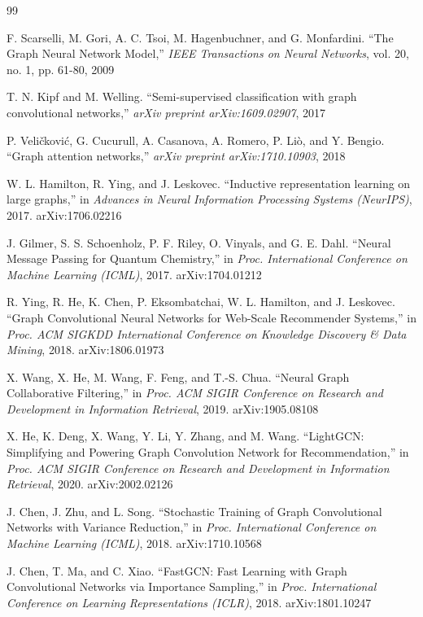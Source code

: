 \renewcommand{\labelsep}{1.5em} 

\begin{thebibliography}{99}

F. Scarselli, M. Gori, A. C. Tsoi, M. Hagenbuchner, and G. Monfardini. ``The Graph Neural Network Model,'' \textit{IEEE Transactions on Neural Networks}, vol. 20, no. 1, pp. 61-80, 2009

T. N. Kipf and M. Welling. ``Semi-supervised classification with graph convolutional networks,'' \textit{arXiv preprint arXiv:1609.02907}, 2017

P. Veličković, G. Cucurull, A. Casanova, A. Romero, P. Liò, and Y. Bengio. ``Graph attention networks,'' \textit{arXiv preprint arXiv:1710.10903}, 2018

W. L. Hamilton, R. Ying, and J. Leskovec. ``Inductive representation learning on large graphs,'' in \textit{Advances in Neural Information Processing Systems (NeurIPS)}, 2017. arXiv:1706.02216

J. Gilmer, S. S. Schoenholz, P. F. Riley, O. Vinyals, and G. E. Dahl. ``Neural Message Passing for Quantum Chemistry,'' in \textit{Proc. International Conference on Machine Learning (ICML)}, 2017. arXiv:1704.01212

R. Ying, R. He, K. Chen, P. Eksombatchai, W. L. Hamilton, and J. Leskovec. ``Graph Convolutional Neural Networks for Web-Scale Recommender Systems,'' in \textit{Proc. ACM SIGKDD International Conference on Knowledge Discovery \& Data Mining}, 2018. arXiv:1806.01973

X. Wang, X. He, M. Wang, F. Feng, and T.-S. Chua. ``Neural Graph Collaborative Filtering,'' in \textit{Proc. ACM SIGIR Conference on Research and Development in Information Retrieval}, 2019. arXiv:1905.08108

X. He, K. Deng, X. Wang, Y. Li, Y. Zhang, and M. Wang. ``LightGCN: Simplifying and Powering Graph Convolution Network for Recommendation,'' in \textit{Proc. ACM SIGIR Conference on Research and Development in Information Retrieval}, 2020. arXiv:2002.02126

J. Chen, J. Zhu, and L. Song. ``Stochastic Training of Graph Convolutional Networks with Variance Reduction,'' in \textit{Proc. International Conference on Machine Learning (ICML)}, 2018. arXiv:1710.10568

J. Chen, T. Ma, and C. Xiao. ``FastGCN: Fast Learning with Graph Convolutional Networks via Importance Sampling,'' in \textit{Proc. International Conference on Learning Representations (ICLR)}, 2018. arXiv:1801.10247


\end{thebibliography}
